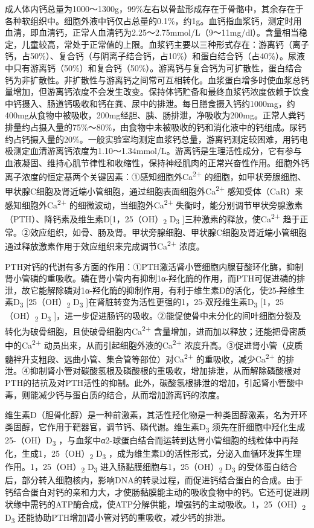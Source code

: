 成人体内钙总量为1000～1300g，99\%左右以骨盐形成存在于骨骼中，其余存在于各种软组织中。细胞外液中钙仅占总量的0.1\%，约1g。血钙指血浆钙，测定时用血清，即血清钙，正常人血清钙为2.25～2.75mmol/L（9～11mg/dl）。含量相当稳定，儿童较高，常处于正常值的上限。血浆钙主要以三种形式存在：游离钙（离子钙，占50\%）、复合钙（与阴离子结合钙，占10\%）和蛋白结合钙（占40\%）。尿液中只有游离钙（50\%）和复合钙（50\%）。游离钙与复合钙为可扩散性，蛋白结合钙为非扩散性。非扩散性与游离钙之间常可互相转化。血浆蛋白增多时使血浆总钙量增加，但游离钙浓度不会发生改变。保持体钙贮备和最终血浆钙浓度依赖于饮食中钙摄入、肠道钙吸收和钙在粪、尿中的排泄。每日膳食摄入钙约1000mg，约400mg从食物中被吸收，200mg经胆、胰、肠排泄，净吸收为200mg。正常人粪钙排量约占摄入量的75\%～80\%，由食物中未被吸收的钙和消化液中的钙组成。尿钙约占钙摄入量的20\%。一般实验室均测定血浆钙总量，游离钙测定较困难，用钙电极测定血清游离钙浓度为1.10～1.34mmol/L。游离钙是生理活性成分，它有参与血液凝固、维持心肌节律性和收缩性，保持神经肌肉的正常兴奋性作用。细胞外钙离子浓度的恒定基两个关键因素：①感知细胞外Ca\textsuperscript{2+}
的细胞，如甲状旁腺细胞、甲状腺C细胞及肾近端小管细胞，通过细胞表面细胞外Ca\textsuperscript{2+}
感知受体（CaR）来感知细胞外Ca\textsuperscript{2+}
的细微波动，当细胞外Ca\textsuperscript{2+}
失衡时，能分别调节甲状旁腺激素（PTH）、降钙素及维生素D{[}1，25（OH）\textsubscript{2}
D\textsubscript{3} {]}三种激素的释放，使Ca\textsuperscript{2+}
趋于正常。②效应组织，如骨、肠及肾。甲状旁腺细胞、甲状腺C细胞及肾近端小管细胞通过释放激素作用于效应组织来完成调节Ca\textsuperscript{2+}
浓度。

PTH对钙的代谢有多方面的作用：①PTH激活肾小管细胞内腺苷酸环化酶，抑制肾小管磷的重吸收。磷在肾小管内有抑制1α-羟化酶的作用，而PTH可促进磷的排泄，故它能解除磷对1α-羟化酶的抑制作用，有利于维生素D的活化，使25-羟维生素D\textsubscript{3}
{[}25（OH）\textsubscript{2} D\textsubscript{3}
{]}在肾脏转变为活性更强的1，25-双羟维生素D\textsubscript{3}
{[}1，25（OH）\textsubscript{2} D\textsubscript{3}
{]}，进一步促进肠钙的吸收。②能促使骨中未分化的间叶细胞分裂及转化为破骨细胞，且使破骨细胞内Ca\textsuperscript{2+}
含量增加，进而加以释放；还能把骨密质中的Ca\textsuperscript{2+}
动员出来，从而引起细胞外液的Ca\textsuperscript{2+}
浓度升高。③促进肾小管（皮质髓袢升支粗段、远曲小管、集合管等部位）对Ca\textsuperscript{2+}
的重吸收，减少Ca\textsuperscript{2+}
的排泄。④抑制肾小管对碳酸氢根及磷酸根的重吸收，增加排泄，从而解除磷酸根对PTH的拮抗及对PTH活性的抑制。此外，碳酸氢根排泄的增加，引起肾小管酸中毒，则能减少钙与蛋白质的结合，从而增加游离钙的浓度。

维生素D（胆骨化醇）是一种前激素，其活性羟化物是一种类固醇激素，名为开环类固醇，它作用于靶器官，调节钙、磷代谢。维生素D\textsubscript{3}
须先在肝细胞中羟化生成25-（OH）D\textsubscript{3}
，与血浆中α2-球蛋白结合而运转到达肾小管细胞的线粒体中再羟化，生成1，25（OH）\textsubscript{2}
D\textsubscript{3}
，成为维生素D的活性形式，分泌入血循环发挥生理作用。1，25（OH）\textsubscript{2}
D\textsubscript{3} 进入肠黏膜细胞与1，25（OH）\textsubscript{2}
D\textsubscript{3}
的受体蛋白结合后，部分转入细胞核内，影响DNA的转录过程，而促进钙结合蛋白的合成。由于钙结合蛋白对钙的亲和力大，才使肠黏膜能主动的吸收食物中的钙。它还可促进刷状缘中需钙的ATP酶合成，使ATP分解供能，增强钙的主动吸收。1，25（OH）\textsubscript{2}
D\textsubscript{3} 还能协助PTH增加肾小管对钙的重吸收，减少钙的排泄。

